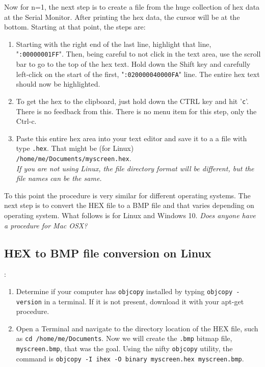 \begin{description}
Now for n=1, the next step is to create a file from the huge collection of hex data at the Serial Monitor.  After printing the hex data, the cursor will be at the bottom.  Starting at that point, the steps are:
\begin{enumerate}

\item Starting with the right end of the last line, highlight that line, "\texttt{:00000001FF}". Then, being careful to not click in the text area, use the scroll bar to go to the top of the hex text. Hold down the Shift key and carefully left-click on the start of the first, "\texttt{:020000040000FA}" line. The entire hex text should now be highlighted.

\item To get the hex to the clipboard, just hold down the CTRL key and hit '\texttt{c}'. There is no feedback from this. There is no menu item for this step, only the Ctrl-c.

\item Paste this entire hex area into your text editor and save it to a a file with type \texttt{.hex}. That might be (for Linux) \\ \texttt{/home/me/Documents/myscreen.hex}.\\  \textit{If you are not using Linux, the file directory format will be different, but the file names can be the same.}
\end{enumerate}

To this point the procedure is very similar for different operating systems.  The next step is to convert the HEX file to a BMP file and that varies depending on operating system.   What follows is for Linux and Windows 10.  \textit{Does anyone have a procedure for Mac OSX?}

\subsection{HEX to BMP file conversion on Linux}:
\begin{enumerate}
\item Determine if your computer has \texttt{objcopy} installed by typing \texttt{objcopy -version} in a terminal.  If it is not present, download it with your apt-get procedure.

\item Open a Terminal and navigate to the directory location of the HEX file, such as \texttt{cd /home/me/Documents}.  Now we will create the \texttt{.bmp} bitmap file, \texttt{myscreen.bmp}, that was the goal.  Using the nifty \texttt{objcopy} utility, the command is \texttt{objcopy -I ihex -O binary myscreen.hex myscreen.bmp}.


\end{enumerate}
\end{description}
